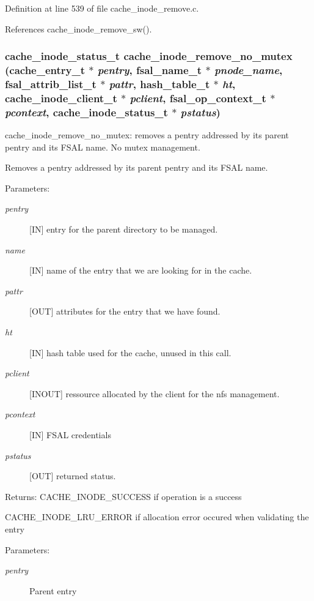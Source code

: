 Definition at line 539 of file cache\_\-inode\_\-remove.c.

References cache\_\-inode\_\-remove\_\-sw().
\subsubsection{\setlength{\rightskip}{0pt plus 5cm}cache\_\-inode\_\-status\_\-t cache\_\-inode\_\-remove\_\-no\_\-mutex (cache\_\-entry\_\-t $\ast$ {\em pentry}, fsal\_\-name\_\-t $\ast$ {\em pnode\_\-name}, fsal\_\-attrib\_\-list\_\-t $\ast$ {\em pattr}, hash\_\-table\_\-t $\ast$ {\em ht}, cache\_\-inode\_\-client\_\-t $\ast$ {\em pclient}, fsal\_\-op\_\-context\_\-t $\ast$ {\em pcontext}, cache\_\-inode\_\-status\_\-t $\ast$ {\em pstatus})}\label{cache__inode__remove_8c_a3}


cache\_\-inode\_\-remove\_\-no\_\-mutex: removes a pentry addressed by its parent pentry and its FSAL name. No mutex management.

Removes a pentry addressed by its parent pentry and its FSAL name.

\begin{Desc}
\item[Parameters:]
\begin{description}
\item[{\em pentry}][IN] entry for the parent directory to be managed. \item[{\em name}][IN] name of the entry that we are looking for in the cache. \item[{\em pattr}][OUT] attributes for the entry that we have found. \item[{\em ht}][IN] hash table used for the cache, unused in this call. \item[{\em pclient}][INOUT] ressource allocated by the client for the nfs management. \item[{\em pcontext}][IN] FSAL credentials \item[{\em pstatus}][OUT] returned status.\end{description}
\end{Desc}
\begin{Desc}
\item[Returns:]CACHE\_\-INODE\_\-SUCCESS if operation is a success \par
 

CACHE\_\-INODE\_\-LRU\_\-ERROR if allocation error occured when validating the entry \end{Desc}
\begin{Desc}
\item[Parameters: ]\par
\begin{description}
\item[{\em 
pentry}]Parent entry \end{description}
\end{Desc}


